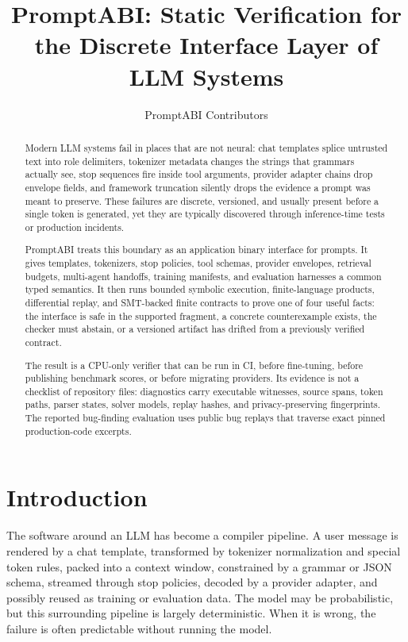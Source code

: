 \documentclass[10pt]{article}
\title{PromptABI: Static Verification for the Discrete Interface Layer of LLM Systems}
\author{PromptABI Contributors}
\date{}
\begin{document}
\maketitle

\begin{abstract}
Modern LLM systems fail in places that are not neural: chat templates splice
untrusted text into role delimiters, tokenizer metadata changes the strings that
grammars actually see, stop sequences fire inside tool arguments, provider
adapter chains drop envelope fields, and framework truncation silently drops
the evidence a prompt was meant to preserve. These failures are discrete,
versioned, and usually present before a single token is generated, yet they are
typically discovered through inference-time tests or production incidents.

PromptABI treats this boundary as an application binary interface for prompts.
It gives templates, tokenizers, stop policies, tool schemas, provider envelopes,
retrieval budgets, multi-agent handoffs, training manifests, and evaluation
harnesses a common typed semantics. It then runs bounded symbolic execution,
finite-language products, differential replay, and SMT-backed finite contracts to
prove one of four useful
facts: the interface is safe in the supported fragment, a concrete counterexample
exists, the checker must abstain, or a versioned artifact has drifted from a
previously verified contract.

The result is a CPU-only verifier that can be run in CI, before fine-tuning,
before publishing benchmark scores, or before migrating providers. Its evidence
is not a checklist of repository files: diagnostics carry executable witnesses,
source spans, token paths, parser states, solver models, replay hashes, and
privacy-preserving fingerprints. The reported bug-finding evaluation uses public
bug replays that traverse exact pinned production-code excerpts.
\end{abstract}

\section{Introduction}

The software around an LLM has become a compiler pipeline. A user message is
rendered by a chat template, transformed by tokenizer normalization and special
token rules, packed into a context window, constrained by a grammar or JSON
schema, streamed through stop policies, decoded by a provider adapter, and
possibly reused as training or evaluation data. The model may be probabilistic,
but this surrounding pipeline is largely deterministic. When it is wrong, the
failure is often predictable without running the model.
\end{document}
